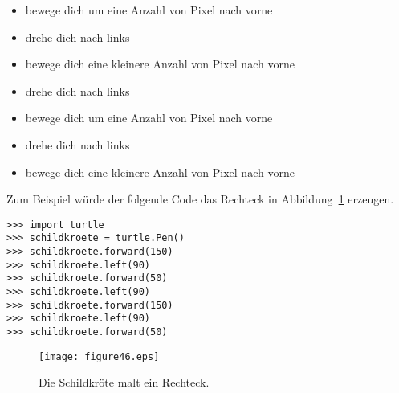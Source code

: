 \begin{itemize}
 \item bewege dich um eine Anzahl von Pixel nach vorne
 \item drehe dich nach links
 \item bewege dich eine kleinere Anzahl von Pixel nach vorne
 \item drehe dich nach links
 \item bewege dich um eine Anzahl von Pixel nach vorne
 \item drehe dich nach links
 \item bewege dich eine kleinere Anzahl von Pixel nach vorne
\end{itemize}
\noindent
Zum Beispiel würde der folgende Code das Rechteck in Abbildung~\ref{fig46} erzeugen.

\begin{listing}
\begin{verbatim}
>>> import turtle
>>> schildkroete = turtle.Pen()
>>> schildkroete.forward(150)
>>> schildkroete.left(90)
>>> schildkroete.forward(50)
>>> schildkroete.left(90)
>>> schildkroete.forward(150)
>>> schildkroete.left(90)
>>> schildkroete.forward(50)
\end{verbatim}
\end{listing}

\begin{figure}
\begin{center}
\texttt{[image: figure46.eps]}
\end{center}
\caption{Die Schildkröte malt ein Rechteck.}\label{fig46}
\end{figure}

